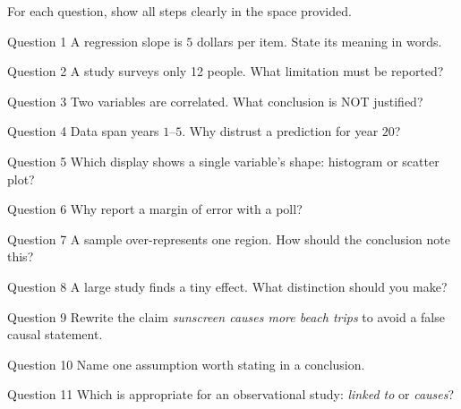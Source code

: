\documentclass[11pt]{article}
\begin{document}
\clearpage
{}
For each question, show all steps clearly in the space provided.

\begin{qbox}{Question 1}
A regression slope is $5$ dollars per item. State its meaning in words.\workspace{2.4cm}
\end{qbox}

\begin{qbox}{Question 2}
A study surveys only 12 people. What limitation must be reported?\workspace{2.4cm}
\end{qbox}

\begin{qbox}{Question 3}
Two variables are correlated. What conclusion is NOT justified?\workspace{2.4cm}
\end{qbox}

\begin{qbox}{Question 4}
Data span years $1$--$5$. Why distrust a prediction for year $20$?\workspace{2.4cm}
\end{qbox}

\begin{qbox}{Question 5}
Which display shows a single variable's shape: histogram or scatter plot?\workspace{2.4cm}
\end{qbox}

\begin{qbox}{Question 6}
Why report a margin of error with a poll?\workspace{2.4cm}
\end{qbox}

\begin{qbox}{Question 7}
A sample over-represents one region. How should the conclusion note this?\workspace{2.4cm}
\end{qbox}

\begin{qbox}{Question 8}
A large study finds a tiny effect. What distinction should you make?\workspace{2.4cm}
\end{qbox}

\begin{qbox}{Question 9}
Rewrite the claim \emph{sunscreen causes more beach trips} to avoid a false causal statement.\workspace{2.4cm}
\end{qbox}

\begin{qbox}{Question 10}
Name one assumption worth stating in a conclusion.\workspace{2.4cm}
\end{qbox}

\begin{qbox}{Question 11}
Which is appropriate for an observational study: \emph{linked to} or \emph{causes}?\workspace{2.4cm}
\end{qbox}
\end{document}
